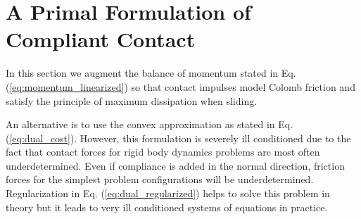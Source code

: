 
\section{A Primal Formulation of Compliant Contact}







In this section we augment the balance of momentum stated in Eq.
(\ref{eq:momentum_linearized}) so that contact impulses model Colomb friction
and satisfy the principle of maximum dissipation when sliding. 

An alternative is to use the convex approximation as stated in Eq.
(\ref{eq:dual_cost}). However, this formulation is severely ill conditioned due
to the fact that contact forces for rigid body dynamics problems are most often
underdetermined. Even if compliance is added in the normal direction, friction
forces for the simplest problem configurations will be underdetermined.
Regularization in Eq. (\ref{eq:dual_regularized}) helps to solve this problem in
theory but it leads to very ill conditioned systems of equations in practice. 

